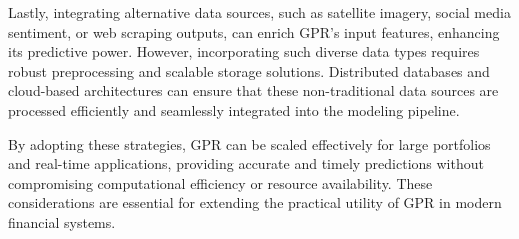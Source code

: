 Lastly, integrating alternative data sources, such as satellite imagery, social media sentiment, or web scraping outputs, can enrich GPR's input features, enhancing its predictive power. However, incorporating such diverse data types requires robust preprocessing and scalable storage solutions. Distributed databases and cloud-based architectures can ensure that these non-traditional data sources are processed efficiently and seamlessly integrated into the modeling pipeline.

By adopting these strategies, GPR can be scaled effectively for large portfolios and real-time applications, providing accurate and timely predictions without compromising computational efficiency or resource availability. These considerations are essential for extending the practical utility of GPR in modern financial systems.








